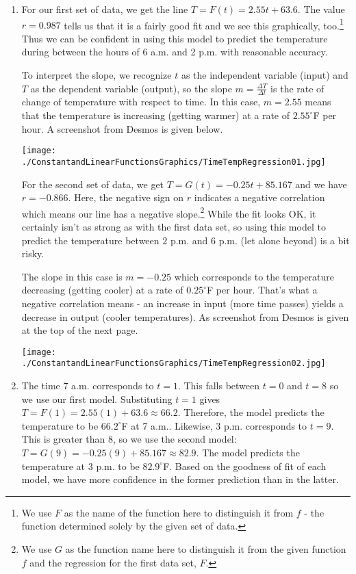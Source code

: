 \documentclass{ximera}
\begin{document}
\begin{example}
\begin{explanation}
\begin{enumerate}
 \item For our first set of data, we get the line $T = F(t) = 2.55t + 63.6$.  The value $r = 0.987$ tells us that it is a fairly good fit and we see this graphically, too.\footnote{We use $F$ as the name of the function here to distinguish it from $f$ - the function determined solely by the given set of data.}   Thus we can be confident in using this model to predict the temperature during between the hours of 6 a.m. and 2 p.m. with reasonable accuracy.   



To interpret the slope, we recognize $t$ as the independent variable (input) and $T$ as the dependent variable (output), so the slope $m = \frac{\Delta T}{\Delta t}$ is the rate of change of temperature with respect to time.   In this case,  $m = 2.55$ means that the temperature is increasing (getting warmer) at a rate of $2.55^{\circ}$F per hour.  A screenshot from Desmos is given below.

\begin{center}
\texttt{[image: ./ConstantandLinearFunctionsGraphics/TimeTempRegression01.jpg]}
\end{center}
  
For the second set of data, we get $T = G(t) = -0.25t + 85.167$ and we have $r = -0.866$.  Here, the negative sign on $r$ indicates a negative correlation which means our line has a negative slope.\footnote{We use $G$ as the function name here to distinguish it from the given function $f$ and the regression for the first data set, $F$.} While the fit looks OK, it certainly isn't as strong as with the first data set, so using this model to predict the temperature between $2$ p.m. and $6$ p.m. (let alone beyond) is a bit risky.  



The slope in this case is $m = -0.25$ which corresponds to the temperature decreasing (getting cooler) at a rate of  $0.25^{\circ}$F per hour.  That's what a negative correlation means - an increase in input (more time passes) yields a decrease in output (cooler temperatures).  As screenshot from Desmos is given at the top of the next page.
  
\begin{center}
\texttt{[image: ./ConstantandLinearFunctionsGraphics/TimeTempRegression02.jpg]}
\end{center}

\item  The time $7$ a.m. corresponds to $t = 1$. This falls between $t = 0$ and $t = 8$ so we use our first model.  Substituting $t = 1$ gives $T = F(1) = 2.55(1) + 63.6 \approx 66.2$.  Therefore, the model predicts the temperature to be $66.2^{\circ}$F at 7 a.m..  Likewise, $3$ p.m. corresponds to $t = 9$.  This is greater than $8$, so we use the second model: $T = G(9) =  -0.25(9) + 85.167 \approx  82.9$.  The model predicts the temperature at $3$ p.m. to be $82.9^{\circ}$F.   Based on the goodness of fit of each model, we have more confidence in the former prediction than in the latter.   
  

\end{enumerate}
\end{explanation}
\end{example}
\end{document}
